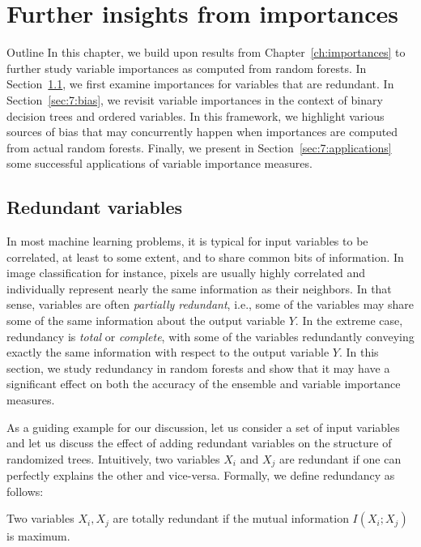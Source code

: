 \chapter{Further insights from importances}\label{ch:applications}

\begin{remark}{Outline}
In this chapter, we build upon results from Chapter~\ref{ch:importances} to
further study variable importances as computed from random forests. In
Section~\ref{sec:7:redundant}, we first examine importances for variables that
are redundant. In Section~\ref{sec:7:bias}, we revisit variable importances in
the context of binary decision trees and ordered variables. In this framework, we
highlight various sources of bias that may concurrently happen when
importances are computed from actual random forests. Finally, we present in
Section~\ref{sec:7:applications} some successful applications
of variable importance measures.
\end{remark}


\section{Redundant variables}
\label{sec:7:redundant}

In most machine learning problems, it is typical for input variables to be
correlated, at least to some extent, and to share common bits of information.
In image classification for instance, pixels are usually highly correlated and
individually represent nearly the same information as their neighbors. In that
sense, variables are often \textit{partially redundant}, i.e., some of the
variables may share some of the same information about the output variable $Y$.
In the extreme case, redundancy is \textit{total}  or \textit{complete}, with
some of the variables redundantly conveying exactly the same information with
respect to the output variable $Y$. In this section, we study redundancy in
random forests and show that it may have a significant effect on both the
accuracy of the ensemble and variable importance measures.

As a guiding example for our discussion, let us consider a set of input
variables and let us discuss the effect of adding redundant variables on the
structure of randomized trees. Intuitively, two variables $X_i$ and $X_j$ are
redundant if one can perfectly explains the other and vice-versa. Formally, we
define redundancy as follows:

\begin{definition}
Two variables $X_i, X_j$ are totally redundant if the mutual information
$I(X_i;X_j)$ is maximum.
\end{definition}

